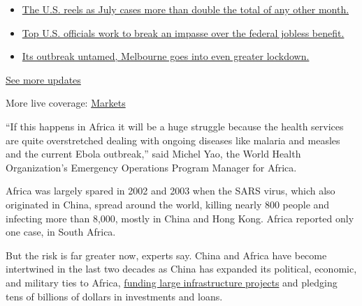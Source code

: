\begin{itemize}
\tightlist
\item
  \href{https://www.nytimes.com/2020/08/01/world/coronavirus-covid-19.html?action=click\&pgtype=Article\&state=default\&region=MAIN_CONTENT_1\&context=storylines_live_updates\#link-34047410}{The
  U.S. reels as July cases more than double the total of any other
  month.}
\item
  \href{https://www.nytimes.com/2020/08/01/world/coronavirus-covid-19.html?action=click\&pgtype=Article\&state=default\&region=MAIN_CONTENT_1\&context=storylines_live_updates\#link-780ec966}{Top
  U.S. officials work to break an impasse over the federal jobless
  benefit.}
\item
  \href{https://www.nytimes.com/2020/08/01/world/coronavirus-covid-19.html?action=click\&pgtype=Article\&state=default\&region=MAIN_CONTENT_1\&context=storylines_live_updates\#link-2bc8948}{Its
  outbreak untamed, Melbourne goes into even greater lockdown.}
\end{itemize}

\href{https://www.nytimes.com/2020/08/01/world/coronavirus-covid-19.html?action=click\&pgtype=Article\&state=default\&region=MAIN_CONTENT_1\&context=storylines_live_updates}{See
more updates}

More live coverage:
\href{https://www.nytimes.com/live/2020/07/31/business/stock-market-today-coronavirus?action=click\&pgtype=Article\&state=default\&region=MAIN_CONTENT_1\&context=storylines_live_updates}{Markets}

``If this happens in Africa it will be a huge struggle because the
health services are quite overstretched dealing with ongoing diseases
like malaria and measles and the current Ebola outbreak,'' said Michel
Yao, the World Health Organization's Emergency Operations Program
Manager for Africa.

Africa was largely spared in 2002 and 2003 when the SARS virus, which
also originated in China, spread around the world, killing nearly 800
people and infecting more than 8,000, mostly in China and Hong Kong.
Africa reported only one case, in South Africa.

But the risk is far greater now, experts say. China and Africa have
become intertwined in the last two decades as China has expanded its
political, economic, and military ties to Africa,
\href{https://www.nytimes.com/2019/01/13/world/africa/china-loans-africa-usa.html}{funding
large infrastructure projects} and pledging tens of billions of dollars
in investments and loans.

